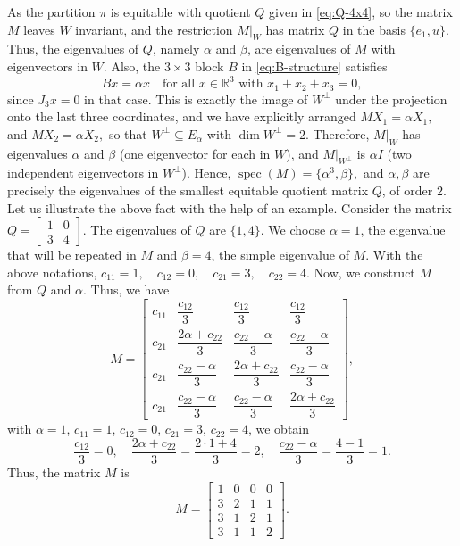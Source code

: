 \documentclass[12pt,twoside]{article}
\begin{document}
	As the partition $\pi$ is equitable with quotient $Q$ given  in
	\eqref{eq:Q-4x4}, so the matrix $M$ leaves $W$ invariant, and the restriction
	$M|_W$ has matrix $Q$ in the basis $\{e_1,u\}$. Thus, the eigenvalues of $Q$,
	namely $\alpha$ and $\beta$, are eigenvalues of $M$ with eigenvectors in $W$. Also, the $3\times 3$ block $B$ in \eqref{eq:B-structure} satisfies
	$$
	B x = \alpha x
	\quad\text{for all }x\in\mathbb{R}^3\text{ with }x_1+x_2+x_3=0,
	$$
	since $J_3x=0$ in that case. This is exactly the image of $W^\perp$ under the
	projection onto the last three coordinates, and we have explicitly arranged $M X_1=\alpha X_1,$ and $M X_2=\alpha X_2,$	so that $W^\perp\subseteq E_\alpha$ with $\dim W^\perp=2$.
	Therefore,  $M|_W$ has eigenvalues $\alpha$ and $\beta$ (one eigenvector for each in $W$), and   $M|_{W^\perp}$ is $\alpha I$ (two independent eigenvectors in $W^\perp$).
	Hence,  $\operatorname{spec}(M)=\{\alpha^{3},\beta\},$ and $\alpha,\beta$ are precisely the eigenvalues of the smallest equitable quotient matrix $Q$, of order $2$.   Let us illustrate the above fact with the help of an example.  Consider the matrix 
	$Q=
	\begin{bmatrix}
		1 & 0\\
		3 & 4
	\end{bmatrix}.$ The eigenvalues of $Q$ are $\{1,4\}.$ We choose $\alpha=1$, the eigenvalue that will be repeated in $M$ and $\beta=4$, the simple eigenvalue of $M$. With the above notations, $	c_{11}=1,\quad c_{12}=0,\quad c_{21}=3,\quad c_{22}=4.$ Now, we construct $M$ from $Q$ and $\alpha$. Thus, we have
	$$
	M
	=
	\begin{bmatrix}
		c_{11} & \dfrac{c_{12}}{3} & \dfrac{c_{12}}{3} & \dfrac{c_{12}}{3}\\
		c_{21} & \dfrac{2\alpha+c_{22}}{3} & \dfrac{c_{22}-\alpha}{3} & \dfrac{c_{22}-\alpha}{3}\\
		c_{21} & \dfrac{c_{22}-\alpha}{3} & \dfrac{2\alpha+c_{22}}{3} & \dfrac{c_{22}-\alpha}{3}\\
		c_{21} & \dfrac{c_{22}-\alpha}{3} & \dfrac{c_{22}-\alpha}{3} & \dfrac{2\alpha+c_{22}}{3}
	\end{bmatrix},
	$$
	with $\alpha=1$, $c_{11}=1$, $c_{12}=0$, $c_{21}=3$, $c_{22}=4$, we obtain
	$$
	\frac{c_{12}}{3}=0,\quad
	\frac{2\alpha+c_{22}}{3}=\frac{2\cdot 1+4}{3}=2,\quad
	\frac{c_{22}-\alpha}{3}=\frac{4-1}{3}=1.
	$$
	Thus, the matrix $M$ is
	$$
	M
	=
	\begin{bmatrix}
		1 & 0 & 0 & 0\\
		3 & 2 & 1 & 1\\
		3 & 1 & 2 & 1\\
		3 & 1 & 1 & 2
	\end{bmatrix}.
	$$
\end{document}
